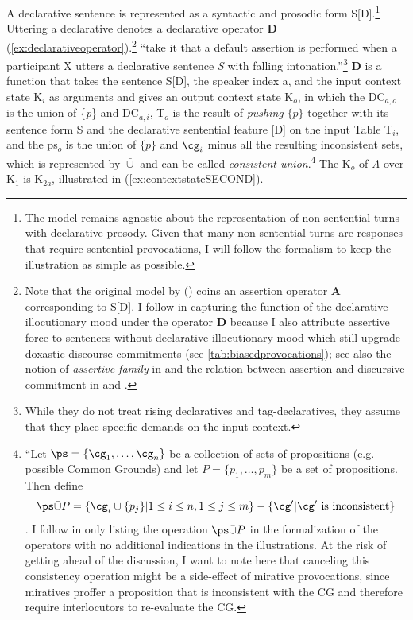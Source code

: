A declarative sentence is represented as a syntactic and prosodic form S[D].\footnote{The model remains agnostic about the representation of non-sentential turns with declarative prosody. Given that many non-sentential turns are responses that require sentential provocations, I will follow the \citeauthor{FarkasBruce.2010} formalism to keep the illustration as simple as possible.} Uttering a declarative denotes a declarative operator \textbf{D} (\ref{ex:declarativeoperator}).\footnote{Note that the original model by \citeauthor{FarkasBruce.2010} (\citeyear{FarkasBruce.2010}) coins an assertion operator \textbf{A} corresponding to S[D]. I follow \citet{Rett.2021emotivemarkers} in capturing the function of the declarative illocutionary mood under the operator \textbf{D} because I also attribute assertive force to sentences without declarative illocutionary mood which still upgrade doxastic discourse commitments (see \autoref{tab:biasedprovocations}); see also the notion of \textit{assertive family} in \citet[11--13]{Jary.2010} and  the relation between assertion and discursive commitment in \citet[157]{Brandom.19942001} and \citet[19--23]{Jary.2010}.} \citet[90]{FarkasBruce.2010} ``take it that a default assertion is performed when a participant X utters a declarative sentence \textit{S} with falling intonation.''\footnote{While they do not treat rising declaratives and tag-declaratives, they assume that they place specific demands on the input context.} \textbf{D} is a function that takes the sentence S[D], the speaker index a, and the input context state K$_{i}$ as arguments and gives an output context state K$_{o}$, in which the 
DC$_{a,o}$ is the union of \{\textit{p}\} and DC$_{a,i}$, T$_{o}$ is the result of \textit{pushing} $\{ p \}$ together with its sentence form S and the declarative sentential feature [D] on the input Table T$_{i}$, and the \ac{ps}$_{o}$ is the union of $\{ p \}$ and $\cg_i$ minus all the 
resulting inconsistent sets, which is represented by $\bar{\cup}$ and can 
be called \textit{consistent union}.\footnote{``Let $\ps= \{\cg_1, \ldots, \cg_n\}$ be a collection of sets of propositions (e.g. possible Common Grounds) and let $P = \{p_1, \ldots, p_m\}$ be a set of propositions. Then define \[\ps \bar{\cup} P = \{\cg_i \cup \{p_j\}| 1 \leq i \leq n, 1 \leq j \leq m\} - \{\cg' | \cg' \text{ is inconsistent}\}\] \citep[90]{FarkasBruce.2010}. I follow \citet{FarkasBruce.2010} in only listing the operation $\ps\bar{\cup}P$ in the formalization of the operators with no additional indications in the illustrations. At the risk of getting ahead of the discussion, I want to note here that canceling this consistency operation might be a side-effect of mirative provocations, since miratives proffer a proposition that is inconsistent with the \ac{CG} and therefore require interlocutors to re-evaluate the \ac{CG}.} The K$_{o}$ of \textit{A} over K$_{1}$ is K$_{2a}$, illustrated in (\ref{ex:contextstateSECOND}).


